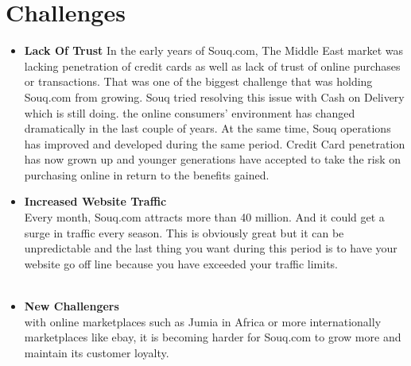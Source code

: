 \documentclass{book}
\begin{document}
\section{Challenges}

\begin{itemize}

\item \textbf{Lack Of Trust}
In the early years of Souq.com, The Middle East market was lacking penetration of credit cards as well as lack of trust of online purchases or transactions. That was one of the biggest challenge that was holding Souq.com from growing. Souq tried resolving this issue with Cash on Delivery which is still doing. the online consumers' environment has changed dramatically in the last couple of years. At the same time, Souq operations has improved and developed during the same period. Credit Card penetration has now grown up and younger generations have accepted to take the risk on purchasing online in return to the benefits gained.\\

\item \textbf{Increased Website Traffic}
	  \\ Every month, Souq.com attracts more than 40 million. And it could get a surge in traffic every season. This is obviously great but it can be unpredictable and the last thing you want during this period is to have your website go off line because you have exceeded your traffic limits.\\\\
	  
\item \textbf{New Challengers}
	  \\ with online marketplaces such as Jumia in Africa or more internationally marketplaces like ebay, it is becoming harder for Souq.com to grow more and maintain its customer loyalty.\\
\end{itemize}
\end{document}
